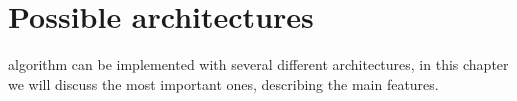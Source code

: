 \chapter{Possible architectures}\label{ch:arches}
\cordic{} algorithm can be implemented with several different architectures,
in this chapter we will discuss the most important ones, describing the main
features.




